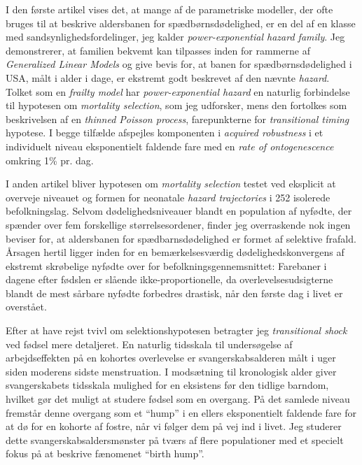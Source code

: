 \documentclass[10pt, twoside]{book}
\begin{document}
I den første artikel vises det, at mange af de parametriske modeller, der ofte bruges til at beskrive aldersbanen for spædbørnsdødelighed, er en del af en klasse med sandsynlighedsfordelinger, jeg kalder \emph{power-exponential hazard family}. Jeg demonstrerer, at familien bekvemt kan tilpasses inden for rammerne af \emph{Generalized Linear Models} og give bevis for, at banen for spædbørnsdødelighed i USA, målt i alder i dage, er ekstremt godt beskrevet af den nævnte \emph{hazard}. Tolket som en \emph{frailty model} har \emph{power-exponential hazard} en naturlig forbindelse til hypotesen om \emph{mortality selection}, som jeg udforsker, mens den fortolkes som beskrivelsen af en \emph{thinned Poisson process}, farepunkterne for \emph{transitional timing} hypotese. I begge tilfælde afspejles komponenten i \emph{acquired robustness} i et individuelt niveau eksponentielt faldende fare med en \emph{rate of ontogenescence} omkring 1\% pr. dag.

I anden artikel bliver hypotesen om \emph{mortality selection} testet ved eksplicit at overveje niveauet og formen for neonatale \emph{hazard trajectories} i 252 isolerede befolkningslag. Selvom dødelighedsniveauer blandt en population af nyfødte, der spænder over fem forskellige størrelsesordener, finder jeg overraskende nok ingen beviser for, at aldersbanen for spædbarnsdødelighed er formet af selektive frafald. Årsagen hertil ligger inden for en bemærkelsesværdig dødelighedskonvergens af ekstremt skrøbelige nyfødte over for befolkningsgennemsnittet: Farebaner i dagene efter fødslen er slående ikke-proportionelle, da overlevelsesudsigterne blandt de mest sårbare nyfødte forbedres drastisk, når den første dag i livet er overstået.

Efter at have rejst tvivl om selektionshypotesen betragter jeg \emph{transitional shock} ved fødsel mere detaljeret. En naturlig tidsskala til undersøgelse af arbejdseffekten på en kohortes overlevelse er svangerskabsalderen målt i uger siden moderens sidste menstruation. I modsætning til kronologisk alder giver svangerskabets tidsskala mulighed for en eksistens før den tidlige barndom, hvilket gør det muligt at studere fødsel som en overgang. På det samlede niveau fremstår denne overgang som et ``hump'' i en ellers eksponentielt faldende fare for at dø for en kohorte af fostre, når vi følger dem på vej ind i livet. Jeg studerer dette svangerskabsaldersmønster på tværs af flere populationer med et specielt fokus på at beskrive fænomenet ``birth hump''.

\clearpage
\end{document}

